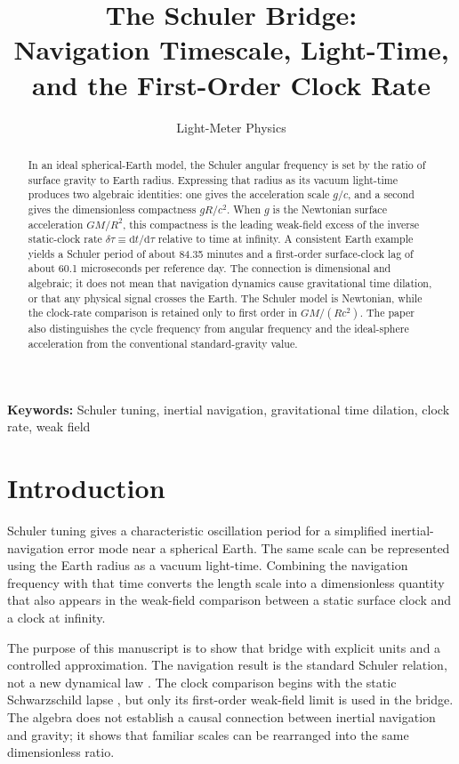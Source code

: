 \documentclass[12pt]{article}
\title{The Schuler Bridge:\\
Navigation Timescale, Light-Time, and the First-Order Clock Rate}
\author{Light-Meter Physics}
\date{}
\begin{document}
\maketitle

\begin{abstract}
In an ideal spherical-Earth model, the Schuler angular frequency is set by the ratio of surface gravity to Earth radius. Expressing that radius as its vacuum light-time produces two algebraic identities: one gives the acceleration scale $g/c$, and a second gives the dimensionless compactness $gR/c^2$. When $g$ is the Newtonian surface acceleration $GM/R^2$, this compactness is the leading weak-field excess of the inverse static-clock rate $\delta\tau\equiv\mathrm{d}t/\mathrm{d}\tau$ relative to time at infinity. A consistent Earth example yields a Schuler period of about 84.35 minutes and a first-order surface-clock lag of about 60.1 microseconds per reference day. The connection is dimensional and algebraic; it does not mean that navigation dynamics cause gravitational time dilation, or that any physical signal crosses the Earth. The Schuler model is Newtonian, while the clock-rate comparison is retained only to first order in $GM/(Rc^2)$. The paper also distinguishes the cycle frequency from angular frequency and the ideal-sphere acceleration from the conventional standard-gravity value.
\end{abstract}

\noindent\textbf{Keywords:} Schuler tuning, inertial navigation, gravitational time dilation, clock rate, weak field

\section{Introduction}

Schuler tuning gives a characteristic oscillation period for a simplified inertial-navigation error mode near a spherical Earth. The same scale can be represented using the Earth radius as a vacuum light-time. Combining the navigation frequency with that time converts the length scale into a dimensionless quantity that also appears in the weak-field comparison between a static surface clock and a clock at infinity.

The purpose of this manuscript is to show that bridge with explicit units and a controlled approximation. The navigation result is the standard Schuler relation, not a new dynamical law \cite{Schuler1923,WhittakerCrassidis}. The clock comparison begins with the static Schwarzschild lapse \cite{Schwarzschild}, but only its first-order weak-field limit is used in the bridge. The algebra does not establish a causal connection between inertial navigation and gravity; it shows that familiar scales can be rearranged into the same dimensionless ratio.
\end{document}
